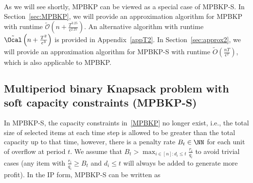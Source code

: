 \documentclass[11pt]{article}
\begin{document}
As we will see shortly, MPBKP can be viewed as a special case of MPBKP-S. In Section~\ref{sec:MPBKP}, we will provide an approximation algorithm for MPBKP with runtime $\tilde{\mathcal{O}}\left(n+\frac{T^{3.25}}{\epsilon^{2.25}}\right)$. An alternative algorithm with runtime $\tilde{\Ocal}\left(n+\frac{T^{2}}{\epsilon^{3}}\right)$ is provided in Appendix~\ref{appT2}. In Section~\ref{sec:approx2}, we will provide an approximation algorithm for MPBKP-S with runtime $\tilde{O}\left(\frac{nT}{\epsilon^2}\right)$, which is also applicable to MPBKP.

\subsection{Multiperiod binary Knapsack problem with soft capacity constraints (MPBKP-S)}
In MPBKP-S, the capacity constraints in~\eqref{MPBKP} no longer exist, i.e., the total size of selected items at each time step is allowed to be greater than the total capacity up to that time, however, there is a penalty rate $B_t\in\NN$ for each unit of overflow at period $t$. We assume that $B_t>\max_{i\in[n]:d_i\le t}\frac{r_i}{q_i}$ to avoid trivial cases (any item with $\frac{r_i}{q_i}\ge B_t$ and $d_i\le t$ will always be added to generate more profit). In the IP form, MPBKP-S can be written as 
\end{document}
